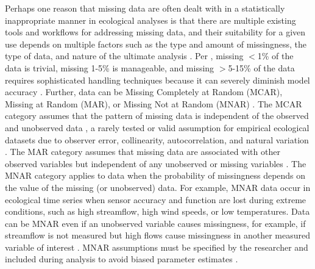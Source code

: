 \documentclass{article}
\begin{document}
Perhaps one reason that missing data are often dealt with in a statistically inappropriate manner in ecological analyses is that there are multiple existing tools and workflows for addressing missing data, and their suitability for a given use depends on multiple factors such as the type and amount of missingness, the type of data, and nature of the ultimate analysis \citep{nakagawa_model_2011, hossie_confronting_2021}. %
Per \citet{luengo2010study}, missing $<$1\% of the data is trivial, missing 1-5\% is manageable, and missing $>$5-15\% of the data requires sophisticated handling techniques because it can severely diminish model accuracy \citep{luengo2010study}. Further, data can be Missing Completely at Random (MCAR), Missing at Random (MAR), or Missing Not at Random (MNAR) \citep[][; see Fig.\ \ref{fig:missingtypes}]{rubin_inference_1976}. The MCAR category assumes that the pattern of missing data is independent of the observed and unobserved data \citep{ellington_using_2015, horton2007much}, a rarely tested or valid assumption for empirical ecological datasets due to observer error, collinearity, autocorrelation, and natural variation \citep{nakagawa_missing_2015, hossie_confronting_2021, little_statistical_2002}. The MAR category assumes that missing data are associated with other observed variables but independent of any unobserved or missing variables \citep{newman_missing_2014, ellington_using_2015}. The MNAR category applies to data when the probability of missingness depends on the value of the missing (or unobserved) data. For example, MNAR data occur in ecological time series when sensor accuracy and function are lost during extreme conditions, such as high streamflow, high wind speeds, or low temperatures. Data can be MNAR even if an unobserved variable causes missingness, for example, if streamflow is not measured but high flows cause missingness in another measured variable of interest  \citep{nakagawa_missing_2015}. MNAR assumptions must be specified by the researcher and included during analysis to avoid biased parameter estimates \citep{newman_missing_2014, dong2013principled}. 
\end{document}
